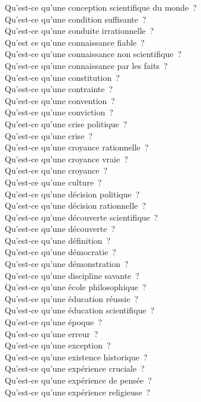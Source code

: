 \documentclass[a4paper,12pt]{article}
\begin{document}
Qu'est-ce qu'une conception scientifique du monde ? \\
Qu'est-ce qu'une condition suffisante ? \\
Qu'est-ce qu'une conduite irrationnelle ? \\
Qu'est ce qu'une connaissance fiable ? \\
Qu'est-ce qu'une connaissance non scientifique ? \\
Qu'est-ce qu'une connaissance par les faits ? \\
Qu'est-ce qu'une constitution ? \\
Qu'est-ce qu'une contrainte ? \\
Qu'est-ce qu'une convention ? \\
Qu'est-ce qu'une conviction ? \\
Qu'est-ce qu'une crise politique ? \\
Qu'est-ce qu'une crise ? \\
Qu'est-ce qu'une croyance rationnelle ? \\
Qu'est-ce qu'une croyance vraie ? \\
Qu'est-ce qu'une croyance ? \\
Qu'est-ce qu'une culture ? \\
Qu'est-ce qu'une décision politique ? \\
Qu'est-ce qu'une décision rationnelle ? \\
Qu'est-ce qu'une découverte scientifique ? \\
Qu'est-ce qu'une découverte ? \\
Qu'est-ce qu'une définition ? \\
Qu'est-ce qu'une démocratie ? \\
Qu'est-ce qu'une démonstration ? \\
Qu'est-ce qu'une discipline savante ? \\
Qu'est-ce qu'une école philosophique ? \\
Qu'est-ce qu'une éducation réussie ? \\
Qu'est-ce qu'une éducation scientifique ? \\
Qu'est-ce qu'une époque ? \\
Qu'est-ce qu'une erreur ? \\
Qu'est-ce qu'une exception ? \\
Qu'est-ce qu'une existence historique ? \\
Qu'est-ce qu'une expérience cruciale ? \\
Qu'est-ce qu'une expérience de pensée ? \\
Qu'est-ce qu'une expérience religieuse ? \\
\end{document}
